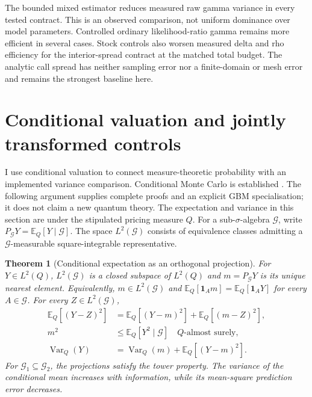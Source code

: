 \documentclass[11pt]{article}
\newtheorem{theorem}{Theorem}[section]
\begin{document}
The bounded mixed estimator reduces measured raw gamma variance in every
tested contract. This is an observed comparison, not uniform dominance
over model parameters. Controlled ordinary likelihood-ratio gamma remains
more efficient in several cases. Stock controls also worsen measured
delta and rho efficiency for the interior-spread contract at the matched
total budget. The analytic call spread has neither sampling error nor a
finite-domain or mesh error and remains the strongest baseline here.

\section{Conditional valuation and jointly transformed controls}
\label{sec:cgbm-projection}

I use conditional valuation to connect measure-theoretic probability with
an implemented variance comparison. Conditional Monte Carlo is established
\citep{asmussen2018}. The following argument supplies complete proofs and
an explicit GBM specialisation; it does not claim a new quantum theory.
The expectation and variance in this section are under the stipulated
pricing measure $Q$. For a sub-$\sigma$-algebra $\mathcal G$, write
$P_{\mathcal G}Y=\mathbb E_Q[Y\mid\mathcal G]$. The space
$L^2(\mathcal G)$ consists of equivalence classes admitting a
$\mathcal G$-measurable square-integrable representative.

\begin{theorem}[Conditional expectation as an orthogonal projection]
\label{thm:cgbm-projection}
For $Y\in L^2(Q)$, $L^2(\mathcal G)$ is a closed subspace of $L^2(Q)$
and $m=P_{\mathcal G}Y$ is its unique nearest element. Equivalently,
$m\in L^2(\mathcal G)$ and
$\mathbb E_Q[\mathbf1_A m]=\mathbb E_Q[\mathbf1_A Y]$
for every $A\in\mathcal G$. For every $Z\in L^2(\mathcal G)$,
\begin{align}
 \mathbb E_Q[(Y-Z)^2]
 &=\mathbb E_Q[(Y-m)^2]+\mathbb E_Q[(m-Z)^2],
 \label{eq:cgbm-projection-pythagoras}\\
 m^2&\leq\mathbb E_Q[Y^2\mid\mathcal G]\quad Q\text{-almost surely},
 \label{eq:cgbm-conditional-jensen}\\
 \operatorname{Var}_Q(Y)
 &=\operatorname{Var}_Q(m)+\mathbb E_Q[(Y-m)^2].
 \label{eq:cgbm-projection-total-variance}
\end{align}
For $\mathcal G_1\subseteq\mathcal G_2$, the projections satisfy the
tower property. The variance of the conditional mean increases with
information, while its mean-square prediction error decreases.
\end{theorem}
\end{document}
